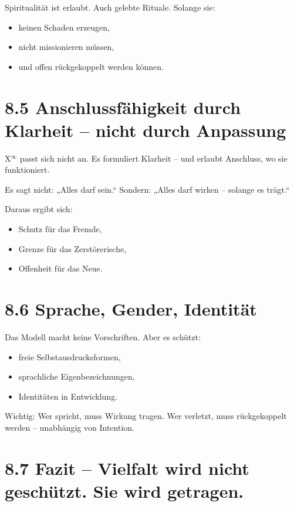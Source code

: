 \documentclass[12pt,a4paper]{book}
\begin{document}
Spiritualität ist erlaubt. Auch gelebte Rituale.  
Solange sie:

\begin{itemize}
    \item keinen Schaden erzeugen,
    \item nicht missionieren müssen,
    \item und offen rückgekoppelt werden können.
\end{itemize}

\section*{8.5 Anschlussfähigkeit durch Klarheit – nicht durch Anpassung}

X$^\infty$ passt sich nicht an.  
Es formuliert Klarheit – und erlaubt Anschluss, wo sie funktioniert.

Es sagt nicht: „Alles darf sein.“  
Sondern: „Alles darf wirken – solange es trägt.“

Daraus ergibt sich:

\begin{itemize}
    \item Schutz für das Fremde,
    \item Grenze für das Zerstörerische,
    \item Offenheit für das Neue.
\end{itemize}

\section*{8.6 Sprache, Gender, Identität}

Das Modell macht keine Vorschriften.  
Aber es schützt:

\begin{itemize}
    \item freie Selbstausdrucksformen,
    \item sprachliche Eigenbezeichnungen,
    \item Identitäten in Entwicklung.
\end{itemize}

Wichtig: Wer spricht, muss Wirkung tragen.  
Wer verletzt, muss rückgekoppelt werden – unabhängig von Intention.

\section*{8.7 Fazit – Vielfalt wird nicht geschützt. Sie wird getragen.}
\end{document}
